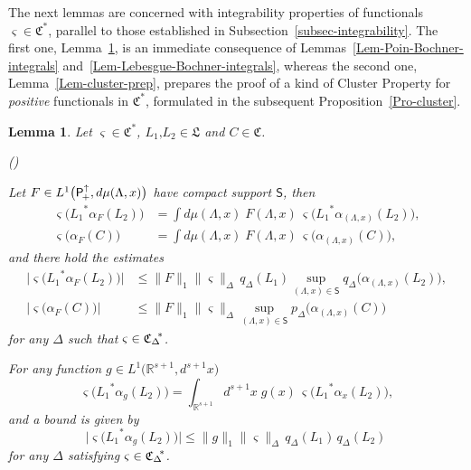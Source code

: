 \documentclass[11pt,twoside,openright]{report}
\theoremstyle{definition}
\theoremstyle{plain}
\newtheorem{Lem}[Def]{Lemma}
\theoremstyle{remark}
\theoremstyle{assumption}
\newcommand{\babs}[1]{\bigl\lvert #1 \bigr\rvert}
\newcommand{\norm}[1]{\lVert #1 \rVert}
\newcommand{\bpDx}[1]{p_\Delta \bigl( #1 \bigr)}
\newcommand{\qDx}[1]{q_\Delta ( #1 )}
\newcommand{\bqDx}[1]{q_\Delta \bigl( #1 \bigr)}
\newcommand{\Cfrak}{\mathfrak{C}}
\newcommand{\Lfrak}{\mathfrak{L}}
\newcommand{\Ssf}{\mathsf{S}}
\newcommand{\Rsone}{\mathbb{R}^{s + 1}}
\newcommand{\Poin}{\mathsf{P}_{\negthinspace +}^\uparrow}
\newcommand{\Cstar}{\mathfrak{C}^*}
\newcommand{\CDstar}{{\mathfrak{C}_\Delta}^{\negthickspace *}}
\newcommand{\aLax}{\alpha_{( \Lambda , x )}}
\newcommand{\ax}{\alpha_x}
\newcounter{propitem}
\newenvironment{proplist}{\begin{list}{(\roman{propitem})}%
  {\usecounter{propitem} \setlength{\topsep}{0ex}%
   \setlength{\parsep}{0.2ex} \setlength{\itemsep}{0.4ex}%
   \setlength{\leftmargin}{0em} \setlength{\itemindent}{0.5em}%
   }}{\end{list}}
\begin{document}
The next lemmas are concerned with integrability properties of
functionals $\varsigma \in \Cstar$, parallel to those established in
Subsection~\ref{subsec-integrability}. The first one,
Lemma~\ref{Lem-varsigma-integrals}, is an immediate consequence of
Lemmas~\ref{Lem-Poin-Bochner-integrals}
and~\ref{Lem-Lebesgue-Bochner-integrals}, whereas the second one,
Lemma~\ref{Lem-cluster-prep}, prepares the proof of a kind of Cluster
Property for \emph{positive} functionals in $\Cstar$, formulated in
the subsequent Proposition~\ref{Pro-cluster}.
\begin{Lem}
  \label{Lem-varsigma-integrals}
  Let $\varsigma \in \Cstar$, $L_1 \text{,} L_2 \in \Lfrak$ and $C \in
  \Cfrak$.
  \begin{proplist}
  \item Let $F \in L^1 \bigl( \Poin , d \mu ( \Lambda , x ) \bigr)$
    have compact support $\Ssf$, then
    \begin{subequations}
      \begin{align}
        \varsigma \bigl( {L_1}^* \alpha_F ( L_2 ) \bigr) & = \int d
        \mu ( \Lambda , x ) \; F ( \Lambda , x ) \, \varsigma \bigl(
        {L_1}^* \aLax ( L_2 ) \bigr) \text{,} \\
        \varsigma \bigl( \alpha_F ( C ) \bigr) & = \int d \mu (
        \Lambda , x ) \; F ( \Lambda , x ) \, \varsigma \bigl( \aLax (
        C ) \bigr) \text{,}
      \end{align}
    \end{subequations}
    and there hold the estimates
    \begin{subequations}
      \begin{align}
        \babs{\varsigma \bigl( {L_1}^* \alpha_F ( L_2 ) \bigr)} &
        \leqslant \norm{F}_1 \norm{\varsigma}_\Delta \, \qDx{L_1}
        \sup_{( \Lambda , x ) \in \Ssf} \bqDx{\aLax ( L_2 )} \text{,}
        \\
        \babs{\varsigma \bigl( \alpha_F ( C ) \bigr)} & \leqslant
        \norm{F}_1 \norm{\varsigma}_\Delta \sup_{( \Lambda , x ) \in
        \Ssf} \bpDx{\aLax(C)}
      \end{align}
    \end{subequations}
    for any $\Delta$ such that $\varsigma \in \CDstar$.
  \item For any function $g \in L^1 \bigl( \Rsone , d^{s + 1} x
    \bigr)$
    \begin{equation}
      \varsigma \bigl( {L_1}^* \alpha_g ( L_2 ) \bigr) = \int_{\Rsone}
      d^{s + 1} x \; g ( x ) \, \varsigma \bigl( {L_1}^* \ax ( L_2 )
      \bigr) \text{,}
    \end{equation}
    and a bound is given by
    \begin{equation}
      \babs{\varsigma \bigl( {L_1}^* \alpha_g ( L_2 ) \bigr)}
      \leqslant \norm{g}_1 \norm{\varsigma}_\Delta \, \qDx{L_1} \,
      \qDx{L_2}
    \end{equation}
    for any $\Delta$ satisfying $\varsigma \in \CDstar$.
  \end{proplist}
\end{Lem}
\end{document}
